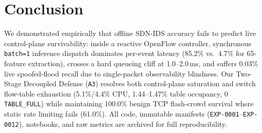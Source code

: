 \documentclass[conference]{IEEEtran}
\begin{document}
\section{Conclusion}
We demonstrated empirically that offline SDN-IDS accuracy fails to predict live control-plane survivability: inside a reactive OpenFlow controller, synchronous \texttt{batch=1} inference dispatch dominates per-event latency (85.2\% vs.\ 4.7\% for 65-feature extraction), crosses a hard queueing cliff at 1.0--2.0\,ms, and suffers 0.03\% live spoofed-flood recall due to single-packet observability blindness. Our Two-Stage Decoupled Defense (\texttt{A3}) resolves both control-plane saturation and switch flow-table exhaustion (5.1\%/4.4\% CPU, 1.44--1.47\% table occupancy, 0 \texttt{TABLE\_FULL}) while maintaining 100.0\% benign TCP flash-crowd survival where static rate limiting fails (61.0\%). All code, immutable manifests (\texttt{EXP-0001}--\texttt{EXP-0012}), notebooks, and raw metrics are archived for full reproducibility.



\end{document}
